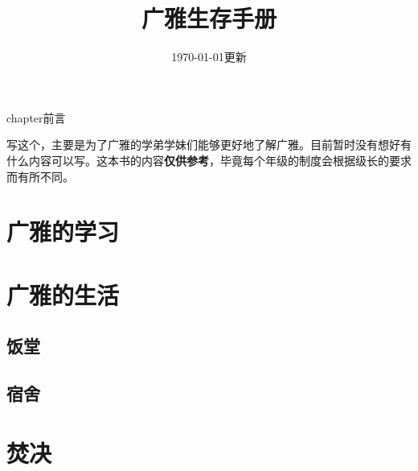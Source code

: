 \documentclass[UTF8]{ctexbook}
\title{\heiti \zihao{1} 广雅生存手册}
\date{\today 更新}
\begin{document}
\maketitle

\*chapter{前言}

写这个，主要是为了广雅的学弟学妹们能够更好地了解广雅。目前暂时没有想好有什么内容可以写。这本书的内容\textbf{仅供参考}，毕竟每个年级的制度会根据级长的要求而有所不同。

\chapter{广雅的学习}

\chapter{广雅的生活}

  \section{饭堂}

  \section{宿舍}

\chapter{焚决}
\end{document}
